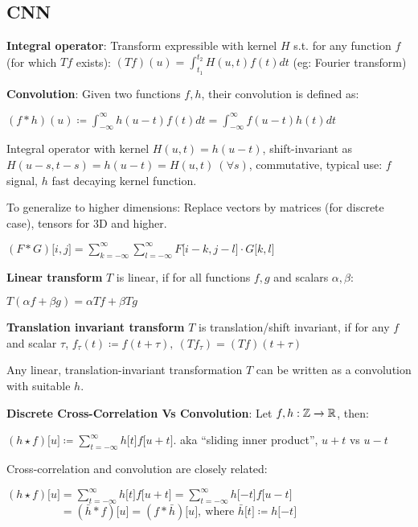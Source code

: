 \subsection{CNN}
\label{sub:cnn}
    \textbf{Integral operator}: Transform expressible with kernel $H$ s.t. for any function $f$ (for which $Tf$ exists): $(Tf)(u)=\int^{t_2}_{t_1}H(u,t)f(t)dt$ (eg: Fourier transform)
    
    \textbf{Convolution}: Given two functions $f,h$, their convolution is defined as:
    
    \tab $(f*h)(u)\coloneqq\int_{-\infty}^{\infty}h(u-t)f(t)dt=\int_{-\infty}^{\infty}f(u-t)h(t)dt $
    
    Integral operator with kernel $H(u,t)=h(u-t)$, shift-invariant as $H(u-s,t-s)=h(u-t)=H(u,t)\>(\forall s)$, commutative, typical use: $f$ signal, $h$ fast decaying kernel function.
    
    To generalize to higher dimensions: Replace vectors by matrices (for discrete case), tensors for 3D and higher.
    
    \tab $(F*G)\lbrack i,j \rbrack = \sum^\infty_{k=-\infty}\sum^\infty_{l=-\infty}F\lbrack i-k, j-l \rbrack \cdot G\lbrack k,l \rbrack$
    
    \textbf{Linear transform} $T$ is linear, if for all functions $f,g$ and scalars $\alpha,\beta$: 
    
    \tab$T(\alpha f+\beta g)=\alpha Tf+\beta Tg$
    
    \textbf{Translation invariant transform} $T$ is translation/shift invariant, if for any $f$ and scalar $\tau$,
    \tab$f_\tau(t)\coloneqq f(t+\tau),\>(Tf_\tau)=(Tf)(t+\tau)$
    
    Any linear, translation-invariant transformation $T$ can be written as a convolution with suitable $h$.
    
    \textbf{Discrete Cross-Correlation Vs Convolution}: Let $f,h:\mathbb{Z}\xrightarrow{}\mathbb R$, then:
    
    \tab$(h\star f)\lbrack u \rbrack\coloneqq\sum\limits^\infty_{t=-\infty}h\lbrack t \rbrack f \lbrack u+t \rbrack$. aka ``sliding inner product'', $u+t$ vs $u-t$
    
    Cross-correlation and convolution are closely related:
    
    \tab$(h\star f)\lbrack u \rbrack=\sum\limits^\infty_{t=-\infty}h\lbrack t \rbrack f \lbrack u+t \rbrack=\sum\limits^\infty_{t=-\infty}h\lbrack -t \rbrack f \lbrack u-t \rbrack$\\
    \tab$\phantom{(h\star f)\lbrack u \rbrack}=(\bar{h}*f)\lbrack u \rbrack=(f*\bar{h})\lbrack u \rbrack,\>\text{where } \bar{h}\lbrack t \rbrack\coloneqq h\lbrack -t\rbrack$
    
